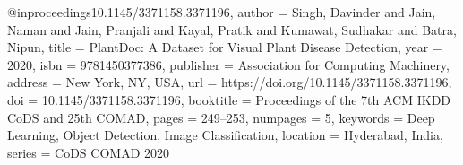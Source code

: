 @inproceedings{10.1145/3371158.3371196,
author = {Singh, Davinder and Jain, Naman and Jain, Pranjali and Kayal, Pratik and Kumawat, Sudhakar and Batra, Nipun},
title = {PlantDoc: A Dataset for Visual Plant Disease Detection},
year = {2020},
isbn = {9781450377386},
publisher = {Association for Computing Machinery},
address = {New York, NY, USA},
url = {https://doi.org/10.1145/3371158.3371196},
doi = {10.1145/3371158.3371196},
booktitle = {Proceedings of the 7th ACM IKDD CoDS and 25th COMAD},
pages = {249–253},
numpages = {5},
keywords = {Deep Learning, Object Detection, Image Classification},
location = {Hyderabad, India},
series = {CoDS COMAD 2020}
}